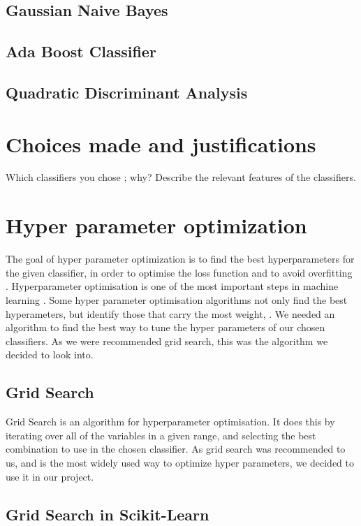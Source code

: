 \documentclass{article}
\begin{document}
	\subsection{Gaussian Naive Bayes}
	
	\subsection{Ada Boost Classifier}
	
	\subsection{Quadratic Discriminant Analysis}

\section{Choices made and justifications}
	Which classifiers you chose ; why?  
	Describe the relevant features of the classifiers.

\newpage
\section{Hyper parameter optimization}

	The goal of hyper parameter optimization is to find the best hyperparameters for the given classifier, in order to optimise the loss function and to avoid overfitting \cite{Bergstra}. Hyperparameter optimisation is one of the most important steps in machine learning \cite{bardenet}. Some hyper parameter optimisation algorithms not only find the best hyperameters, but identify those that carry the most weight, \cite{Bergstra}.
	We needed an algorithm to find the best way to tune the hyper parameters of our chosen classifiers.  As we were recommended grid search, this was the algorithm we decided to look into.  
	
	\subsection{Grid Search}
	
		Grid Search is an algorithm for hyperparameter optimisation. It does this by iterating over all of the variables in a given range, and selecting the best combination to use in the chosen classifier. 
		As grid search was recommended to us, and is the most widely used way to optimize hyper parameters, we decided to use it in our project.
		
	\subsection{Grid Search in Scikit-Learn}
	
\end{document}
